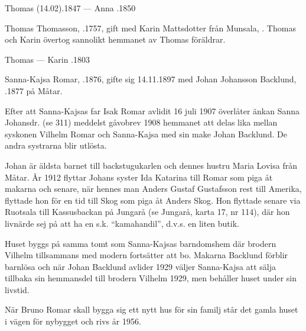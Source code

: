 Thomas (14.02).1847  ---  Anna .1850


%
Thomas Thomasson, .1757, gift med Karin Mattsdotter från Munsala, . Thomas och Karin övertog sannolikt hemmanet av Thomas föräldrar.
\begin{jhchildren}
  \item {}
  \item {}
\end{jhchildren}

Thomas   ---  Karin .1803



%



%
Sanna-Kajsa Romar, .1876, gifte sig 14.11.1897 med Johan Johansson Backlund, .1877 på Måtar.

Efter att Sanna-Kajsas far Isak Romar avlidit 16 juli 1907 överlåter änkan Sanna Johansdr. (se 311) meddelst gåvobrev 1908 hemmanet att delas lika mellan syskonen Vilhelm Romar och Sanna-Kajsa med sin make Johan Backlund. De andra systrarna blir utlösta.

Johan är äldsta barnet till backstugukarlen  och dennes hustru Maria Lovisa från Måtar. År 1912 flyttar Johans syster Ida Katarina till Romar som piga åt makarna och senare, när hennes man Anders Gustaf Gustafsson rest till Amerika, flyttade hon för en tid till Skog som piga åt Anders Skog. Hon flyttade senare via Ruotsala till Kassusbackan på Jungarå (se Jungarå, karta 17, nr 114), där hon livnärde sej på att ha en s.k. ``kamahandil'', d.v.s. en liten butik.

Huset byggs på samma tomt som Sanna-Kajsas barndomshem där brodern Vilhelm tillsammans med modern fortsätter att bo. Makarna Backlund förblir barnlösa och när Johan Backlund avlider 1929 väljer Sanna-Kajsa att sälja tillbaka sin hemmansdel till brodern Vilhelm 1929, men behåller huset under sin livstid.

När Bruno Romar skall bygga sig ett nytt hus för sin familj står det gamla huset i vägen för nybygget och rivs år 1956.



